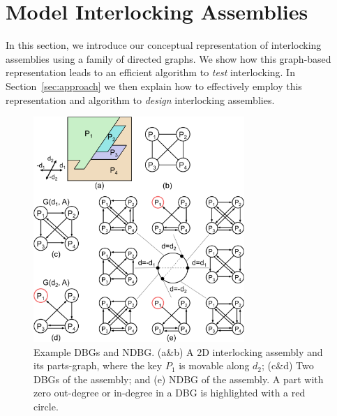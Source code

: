 
\section{Model Interlocking Assemblies}
\label{sec:model}



In this section, we introduce our conceptual representation of interlocking assemblies using a family of directed graphs. We show how this graph-based representation leads to an efficient algorithm to {\em test} interlocking. 
In Section~\ref{sec:approach} we then explain how to effectively employ this representation and algorithm to {\em design} interlocking assemblies.


\begin{figure}[!t]
	\centering
	\includegraphics[width=8.00cm]{images/NDBG.png}
	\vspace*{-2.5mm}
	\caption{Example DBGs and NDBG.
		(a\&b) A 2D interlocking assembly and its parts-graph, where the key $P_1$ is movable along $d_2$;
		(c\&d) Two DBGs of the assembly; and
		(e) NDBG of the assembly.
		A part with zero out-degree or in-degree in a DBG is highlighted with a red circle. 
	}
	\vspace*{-4.0mm}
	\label{fig:NDBG}
\end{figure}



